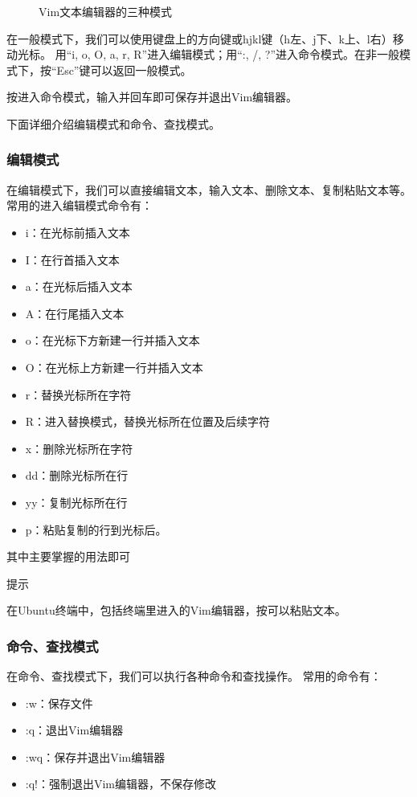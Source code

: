 \begin{figure}[!h]
\begin{tikzpicture}[x=0.75pt,y=0.75pt,yscale=-1,xscale=1]
\end{tikzpicture}


\caption{Vim文本编辑器的三种模式} 
\end{figure} 

在一般模式下，我们可以使用键盘上的方向键或hjkl键（h左、j下、k上、l右）移动光标。
用“i, o, O, a, r, R”进入编辑模式；用“:, /, ?”进入命令模式。在非一般模式下，按“Esc”键可以返回一般模式。

按\code{:}进入命令模式，输入并回车即可保存并退出Vim编辑器。

下面详细介绍编辑模式和命令、查找模式。

\subsubsection{编辑模式}
在编辑模式下，我们可以直接编辑文本，输入文本、删除文本、复制粘贴文本等。
常用的进入编辑模式命令有：
\begin{itemize}
\item i：在光标前插入文本
\item I：在行首插入文本
\item a：在光标后插入文本
\item A：在行尾插入文本
\item o：在光标下方新建一行并插入文本
\item O：在光标上方新建一行并插入文本
\item r：替换光标所在字符
\item R：进入替换模式，替换光标所在位置及后续字符
\item x：删除光标所在字符
\item dd：删除光标所在行
\item yy：复制光标所在行
\item p：粘贴复制的行到光标后。
\end{itemize}

其中主要掌握的用法即可

\begin{zy}
提示

在Ubuntu终端中，包括终端里进入的Vim编辑器，按可以粘贴文本。
\end{zy}

\subsubsection{命令、查找模式}
在命令、查找模式下，我们可以执行各种命令和查找操作。
常用的命令有：
\begin{itemize}
\item :w：保存文件
\item :q：退出Vim编辑器
\item :wq：保存并退出Vim编辑器
\item :q!：强制退出Vim编辑器，不保存修改
\end{itemize}

